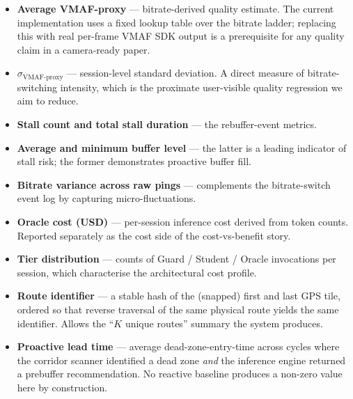\documentclass[conference]{IEEEtran}
\begin{document}
\begin{itemize}
  \item \textbf{Average VMAF-proxy} --- bitrate-derived quality
        estimate. The current implementation uses a fixed lookup table
        over the bitrate ladder; replacing this with real per-frame
        VMAF SDK output is a prerequisite for any quality claim in a
        camera-ready paper.
  \item \textbf{$\sigma_{\text{VMAF-proxy}}$} --- session-level
        standard deviation. A direct measure of bitrate-switching
        intensity, which is the proximate user-visible quality
        regression we aim to reduce.
  \item \textbf{Stall count and total stall duration} --- the
        rebuffer-event metrics.
  \item \textbf{Average and minimum buffer level} --- the latter is a
        leading indicator of stall risk; the former demonstrates
        proactive buffer fill.
  \item \textbf{Bitrate variance across raw pings} --- complements the
        bitrate-switch event log by capturing micro-fluctuations.
  \item \textbf{Oracle cost (USD)} --- per-session inference cost
        derived from token counts. Reported separately as the cost
        side of the cost-vs-benefit story.
  \item \textbf{Tier distribution} --- counts of Guard / Student /
        Oracle invocations per session, which characterise the
        architectural cost profile.
  \item \textbf{Route identifier} --- a stable hash of the (snapped)
        first and last GPS tile, ordered so that reverse traversal of
        the same physical route yields the same identifier. Allows the
        ``$K$ unique routes'' summary the system produces.
  \item \textbf{Proactive lead time} --- average dead-zone-entry-time
        across cycles where the corridor scanner identified a dead
        zone \emph{and} the inference engine returned a prebuffer
        recommendation. No reactive baseline produces a non-zero value
        here by construction.
\end{itemize}
\end{document}
